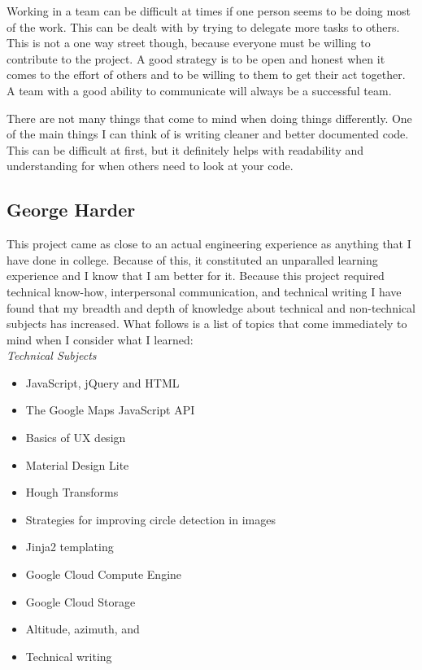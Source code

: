 \documentclass[10pt, onecolumn, draftclsnofoot, letterpaper, compsoc]{IEEEtran}
\begin{document}
Working in a team can be difficult at times if one person seems to be doing
most of the work. This can be dealt with by trying to delegate more tasks to
others. This is not a one way street though, because everyone must be willing
to contribute to the project. A good strategy is to be open and honest when it
comes to the effort of others and to be willing to them to get their act
together. A team with a good ability to communicate will always be a successful
team.

There are not many things that come to mind when doing things differently. One
of the main things I can think of is writing cleaner and better documented code.
This can be difficult at first, but it definitely helps with readability
and understanding for when others need to look at your code.

\subsection{George Harder}

This project came as close to an actual engineering experience as anything that I have
done in college. Because of this, it constituted an unparalled learning experience
and I know that I am better for it. Because this project required technical know-how,
interpersonal communication, and technical writing I have found that my breadth and
depth of knowledge about technical and non-technical subjects has increased. What
follows is a list of topics that come immediately to mind when I consider what
I learned: \\

\noindent \textit{Technical Subjects}
\begin{itemize}
	\item JavaScript, jQuery and HTML
    \item The Google Maps JavaScript API
    \item Basics of UX design
    \item Material Design Lite
    \item Hough Transforms
    \item Strategies for improving circle detection in images
    \item Jinja2 templating
    \item Google Cloud Compute Engine
    \item Google Cloud Storage
    \item Altitude, azimuth, and
    \item Technical writing \\
\end{itemize}
\end{document}
